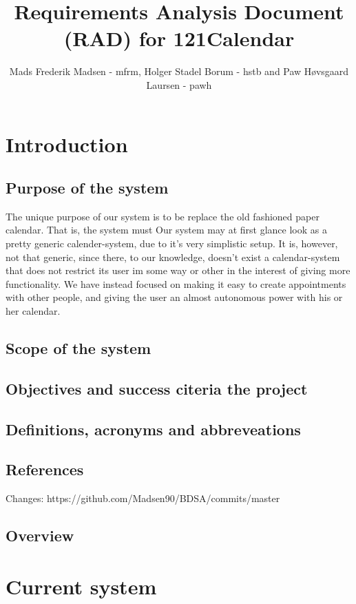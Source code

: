 \documentclass{article}
\begin{document}
\title{Requirements Analysis Document (RAD) for 121Calendar}
\author{Mads Frederik Madsen - mfrm, Holger Stadel Borum - hstb and Paw H\o vsgaard Laursen - pawh}
\maketitle
\tableofcontents

\section{Introduction}
	\subsection{Purpose of the system}
	The unique purpose of our system is to be replace the old fashioned paper calendar. That is, the system must   Our system may at first glance look as a pretty generic calender-system, due to it's very simplistic setup. It is, however, not that generic, since there, to our knowledge, doesn't exist a calendar-system that does not restrict its user im some way or other in the interest of giving more functionality. We have instead focused on making it easy to create appointments with other people, and giving the user an almost autonomous power with his or her calendar. 
	\subsection{Scope of the system}

	\subsection{Objectives and success citeria the project}
	
	\subsection{Definitions, acronyms and abbreveations}
	
	\subsection{References}
	Changes:
	https://github.com/Madsen90/BDSA/commits/master
	\subsection{Overview}
\section{Current system}
\end{document}
